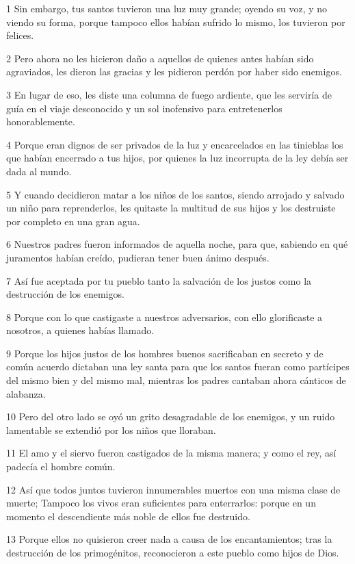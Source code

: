 \par 1 Sin embargo, tus santos tuvieron una luz muy grande; oyendo su voz, y no viendo su forma, porque tampoco ellos habían sufrido lo mismo, los tuvieron por felices.
\par 2 Pero ahora no les hicieron daño a aquellos de quienes antes habían sido agraviados, les dieron las gracias y les pidieron perdón por haber sido enemigos.
\par 3 En lugar de eso, les diste una columna de fuego ardiente, que les serviría de guía en el viaje desconocido y un sol inofensivo para entretenerlos honorablemente.
\par 4 Porque eran dignos de ser privados de la luz y encarcelados en las tinieblas los que habían encerrado a tus hijos, por quienes la luz incorrupta de la ley debía ser dada al mundo.
\par 5 Y cuando decidieron matar a los niños de los santos, siendo arrojado y salvado un niño para reprenderlos, les quitaste la multitud de sus hijos y los destruiste por completo en una gran agua.
\par 6 Nuestros padres fueron informados de aquella noche, para que, sabiendo en qué juramentos habían creído, pudieran tener buen ánimo después.
\par 7 Así fue aceptada por tu pueblo tanto la salvación de los justos como la destrucción de los enemigos.
\par 8 Porque con lo que castigaste a nuestros adversarios, con ello glorificaste a nosotros, a quienes habías llamado.
\par 9 Porque los hijos justos de los hombres buenos sacrificaban en secreto y de común acuerdo dictaban una ley santa para que los santos fueran como partícipes del mismo bien y del mismo mal, mientras los padres cantaban ahora cánticos de alabanza.
\par 10 Pero del otro lado se oyó un grito desagradable de los enemigos, y un ruido lamentable se extendió por los niños que lloraban.
\par 11 El amo y el siervo fueron castigados de la misma manera; y como el rey, así padecía el hombre común.
\par 12 Así que todos juntos tuvieron innumerables muertos con una misma clase de muerte; Tampoco los vivos eran suficientes para enterrarlos: porque en un momento el descendiente más noble de ellos fue destruido.
\par 13 Porque ellos no quisieron creer nada a causa de los encantamientos; tras la destrucción de los primogénitos, reconocieron a este pueblo como hijos de Dios.
